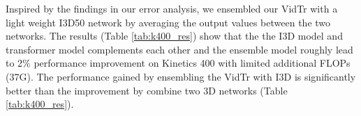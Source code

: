 \documentclass[10pt,twocolumn,letterpaper]{article}
\begin{document}
Inspired by the findings in our error analysis, we ensembled our VidTr with a light weight I3D50 network by averaging the output values between the two networks. The results (Table \ref{tab:k400_res}) show that the the I3D model and transformer model complements each other and the ensemble model roughly lead to 2\% performance improvement on Kinetics 400 with limited additional FLOPs (37G). The performance gained by ensembling the VidTr with I3D is significantly better than the improvement by combine two 3D networks (Table \ref{tab:k400_res}).

\end{document}
